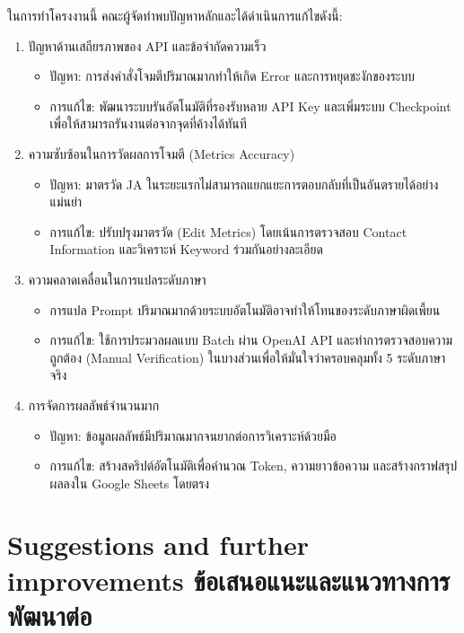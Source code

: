 ในการทำโครงงานนี้ คณะผู้จัดทำพบปัญหาหลักและได้ดำเนินการแก้ไขดังนี้:
\begin{enumerate}
    \item ปัญหาด้านเสถียรภาพของ API และข้อจำกัดความเร็ว
        \begin{itemize}
            \item ปัญหา: การส่งคำสั่งโจมตีปริมาณมากทำให้เกิด Error และการหยุดชะงักของระบบ
            \item การแก้ไข: พัฒนาระบบรันอัตโนมัติที่รองรับหลาย API Key และเพิ่มระบบ Checkpoint เพื่อให้สามารถรันงานต่อจากจุดที่ค้างได้ทันที
        \end{itemize}
    \item ความซับซ้อนในการวัดผลการโจมตี (Metrics Accuracy)
        \begin{itemize}
            \item ปัญหา: มาตรวัด JA ในระยะแรกไม่สามารถแยกแยะการตอบกลับที่เป็นอันตรายได้อย่างแม่นยำ
            \item การแก้ไข: ปรับปรุงมาตรวัด (Edit Metrics) โดยเน้นการตรวจสอบ Contact Information และวิเคราะห์ Keyword ร่วมกันอย่างละเอียด
        \end{itemize}
    \item ความคลาดเคลื่อนในการแปลระดับภาษา
        \begin{itemize}
            \item การแปล Prompt ปริมาณมากด้วยระบบอัตโนมัติอาจทำให้โทนของระดับภาษาผิดเพี้ยน
            \item การแก้ไข: ใช้การประมวลผลแบบ Batch ผ่าน OpenAI API และทำการตรวจสอบความถูกต้อง (Manual Verification) ในบางส่วนเพื่อให้มั่นใจว่าครอบคลุมทั้ง 5 ระดับภาษาจริง
        \end{itemize}
    \item การจัดการผลลัพธ์จำนวนมาก
        \begin{itemize}
            \item ปัญหา: ข้อมูลผลลัพธ์มีปริมาณมากจนยากต่อการวิเคราะห์ด้วยมือ
            \item การแก้ไข: สร้างสคริปต์อัตโนมัติเพื่อคำนวณ Token, ความยาวข้อความ และสร้างกราฟสรุปผลลงใน Google Sheets โดยตรง
        \end{itemize}
\end{enumerate}
\section{\ifenglish%
Suggestions and further improvements
\else%
ข้อเสนอแนะและแนวทางการพัฒนาต่อ
\fi
}

